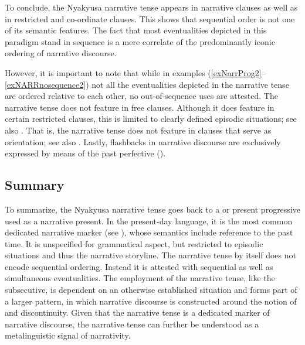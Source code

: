 To conclude, the Nyakyusa narrative tense appears in narrative clauses as well as in restricted and co-ordinate clauses. This shows that sequential order is not one of its semantic features. The fact that most eventualities depicted in this paradigm stand in sequence is a mere correlate of the predominantly iconic ordering of narrative discourse.

However, it is important to note that while in examples (\ref{exNarrProg2}--\ref{exNARRnosequence2}) not all the eventualities depicted in the narrative tense are ordered relative to each other, no out-of-sequence uses are attested. The narrative tense does not feature in free clauses.  Although it does feature in certain restricted clauses, this is limited to clearly defined episodic situations; see also . That is, the narrative tense does not feature in clauses that serve as orientation; see also . Lastly, flashbacks in narrative discourse are exclusively expressed by means of the past perfective ().
\subsection{Summary}
To summarize, the Nyakyusa narrative tense goes back to a  or present progressive used as a narrative present. In the present-day language, it is the most common dedicated narrative marker (see ), whose semantics include reference to the past time. It is unspecified for grammatical aspect, but restricted to episodic situations and thus the narrative storyline. The narrative tense by itself does not encode sequential ordering. Instead it is attested with sequential as well as simultaneous eventualities. The employment of the narrative tense, like the subsecutive, is dependent on an otherwise established situation and forms part of a larger pattern, in which narrative discourse is constructed around the notion of  and discontinuity.  Given that the narrative tense is a dedicated marker of narrative  discourse, the narrative tense can further be understood as a metalinguistic signal of narrativity.
